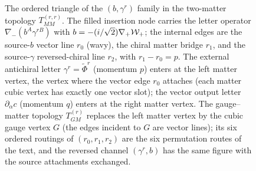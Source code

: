 \begin{figure}[t]
\centering
{}
\caption{The ordered triangle of the $(b,\gamma^{r})$ family in the two-matter topology $T_{MM}^{(r,r)}$. The filled
insertion node carries the letter operator $\nabla_{-}(b^{A}\gamma^{rB})$ with $b=-(i/\sqrt2)\nabla_{+}\mathcal{W}_{+}$;
the internal edges are the source-$b$ vector line $r_{0}$ (wavy), the chiral matter bridge $r_{1}$, and the
source-$\gamma$ reversed-chiral line $r_{2}$, with $r_{1}-r_{0}=p$. The external antichiral letter
$\gamma^{r}=\widetilde\Phi^{r}$ (momentum $p$) enters at the left matter vertex, the vertex where the vector
edge $r_{0}$ attaches (each matter cubic vertex has exactly one vector slot); the vector output letter
$\partial_{\dot\alpha}c$ (momentum $q$) enters at the right matter vertex. The gauge--matter topology
$T_{GM}^{(r)}$ replaces the left matter vertex by the cubic gauge vertex $G$ (the edges incident to $G$ are
vector lines); its six ordered routings of $(r_{0},r_{1},r_{2})$ are the six permutation routes of the text, and
the reversed channel $(\gamma^{r},b)$ has the same figure with the source attachments exchanged.}
\label{fig:bg:triangle}
\end{figure}

